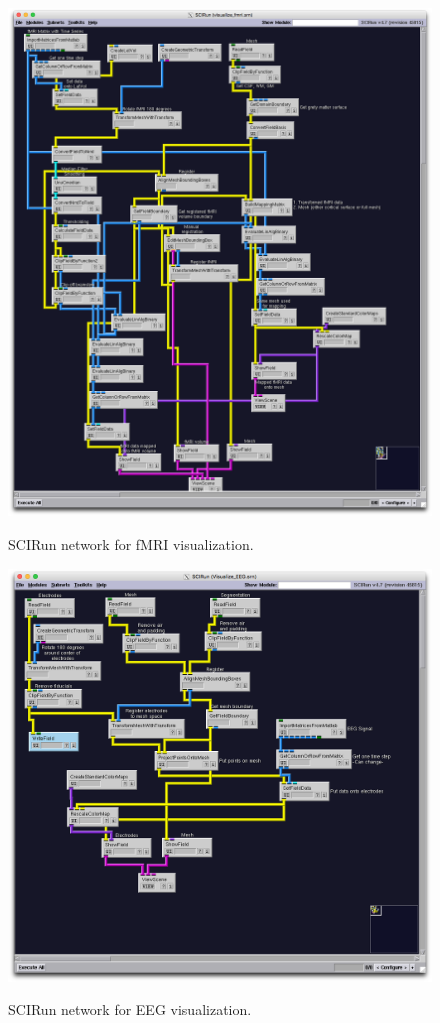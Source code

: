 \begin{figure}[p]
\begin{center}
\includegraphics[width=\textwidth]{Figures/fmri_network.png}\\
\caption{SCIRun network for fMRI visualization.}
\label{fig:fmrivisnet}
\end{center}
\end{figure}

\begin{figure}[p]
\begin{center}
\includegraphics[width=\textwidth]{Figures/EEG_network.png}\\
\caption{SCIRun network for EEG visualization.}
\label{fig:eegvisnet}
\end{center}
\end{figure} 